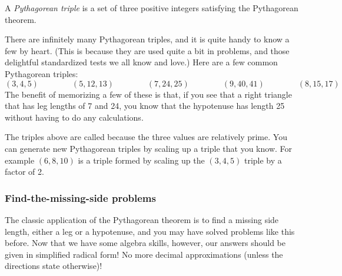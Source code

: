 \begin{boxdef}
A \textit{Pythagorean triple} is a set of three positive integers satisfying the Pythagorean theorem.
\end{boxdef}

There are infinitely many Pythagorean triples, and it is quite handy to know a few by heart. (This is because they are used quite a bit in problems, and those delightful standardized tests we all know and love.) Here are a few common Pythagorean triples:
\[
(3, 4, 5) \qquad\qquad
(5, 12, 13) \qquad\qquad
(7, 24, 25) \qquad\qquad
(9, 40, 41) \qquad\qquad
(8, 15, 17)
\]
The benefit of memorizing a few of these is that, if you see that a right triangle that has leg lengths of 7 and 24, you know that the hypotenuse has length 25 without having to do any calculations.

The triples above are called  because the three values are relatively prime. You can generate new Pythagorean triples by scaling up a triple that you know. For example $(6, 8, 10)$ is a triple formed by scaling up the $(3, 4, 5)$ triple by a factor of 2.

\subsubsection{Find-the-missing-side problems}

The classic application of the Pythagorean theorem is to find a missing side length, either a leg or a hypotenuse, and you may have solved problems like this before. Now that we have some algebra skills, however, our answers should be given in simplified radical form! No more decimal approximations (unless the directions state otherwise)!

